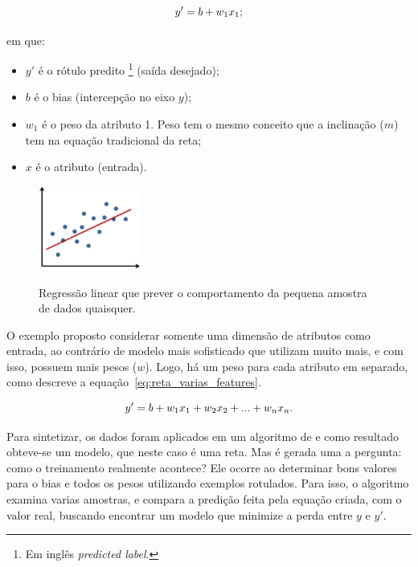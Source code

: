             \begin{equation}\label{eq:reta}
                \centering
                y' = b + w_{1}x_{1};
            \end{equation}
        
            em que:
            \begin{itemize}
                \item $y'$ é o rótulo predito \footnote{Em inglês \textit{predicted label}.} (saída desejado);
                \item $b$ é o bias (intercepção no eixo $y$);
                \item $w_{1}$ é o peso da atributo 1. Peso tem o mesmo conceito que a inclinação ($m$) tem na equação tradicional da reta;
                \item $x$ é o atributo (entrada).
            \end{itemize}
    
            \begin{figure}[H]
                \centering
                \caption{Regressão linear que prever o comportamento da pequena amostra de dados quaisquer.}
                \includegraphics[width=0.3\textwidth]{fig/2-fundamentacao/treinar_modelo_simples/dados_quaisquer_regrassao.png}
                \label{fig:dados_quaisquer_regressao}
            \end{figure}
            
            O exemplo proposto considerar somente uma dimensão de atributos como entrada, ao contrário de modelo mais sofisticado que utilizam muito mais, e com isso, possuem mais pesos ($w$). Logo, há um peso para cada atributo em separado, como descreve a equação~\ref{eq:reta_varias_features}. 
            
            \begin{equation}
                \centering
                y' =  b + w_{1}x_{1} + w_{2}x_{2} + ... + w_{n}x_{n}.
                \label{eq:reta_varias_features}
            \end{equation}
            
            Para sintetizar, os dados foram aplicados em um algoritmo de \am e como resultado obteve-se um modelo, que neste caso é uma reta. Mas é gerada uma a pergunta: como o treinamento realmente acontece? Ele ocorre ao determinar bons valores para o bias e todos os pesos utilizando exemplos rotulados. Para isso, o algoritmo examina varias amostras, e compara a predição feita pela equação criada, com o valor real, buscando encontrar um modelo que minimize a perda entre $y$ e $y'$.
            
